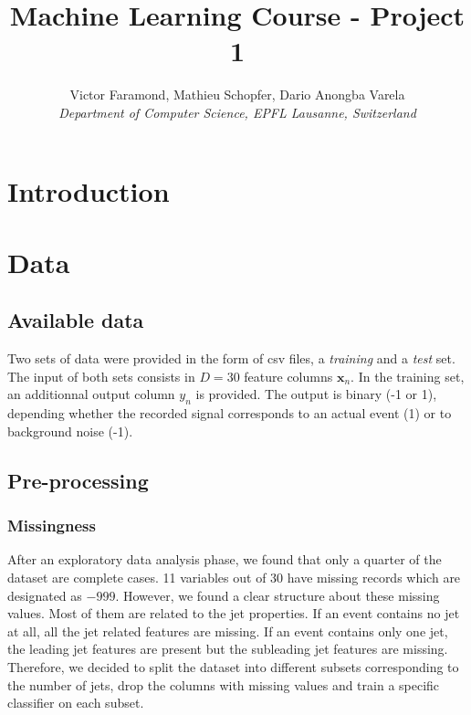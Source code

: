 \documentclass[10pt,conference,compsocconf]{IEEEtran}
\begin{document}
\title{Machine Learning Course - Project 1}

\author{
  Victor Faramond, Mathieu Schopfer, Dario Anongba Varela\\
  \textit{Department of Computer Science, EPFL Lausanne, Switzerland}
}

\maketitle

\begin{abstract}
\end{abstract}

\section{Introduction}

\section{Data}

\subsection{Available data}
Two sets of data were provided in the form of csv files, a \textit{training} and a \textit{test} set. The input of both sets consists in $D=30$ feature columns $\mathbf{x}_n$. In the training set, an additionnal output column $y_n$ is provided. The output is binary (-1 or 1), depending whether the recorded signal corresponds to an actual event (1) or to background noise (-1).

\subsection{Pre-processing}

\subsubsection{Missingness}
After an exploratory data analysis phase, we found that only a quarter of the dataset are complete cases. 11 variables out of 30 have missing records which are designated as $-999$. However, we found a clear structure about these missing values. Most of them are related to the jet properties. If an event contains no jet at all, all the jet related features are missing. If an event contains only one jet, the leading jet features are present but the subleading jet features are missing. Therefore, we decided to split the dataset into different subsets corresponding to the number of jets, drop the columns with missing values and train a specific classifier on each subset.
\end{document}

